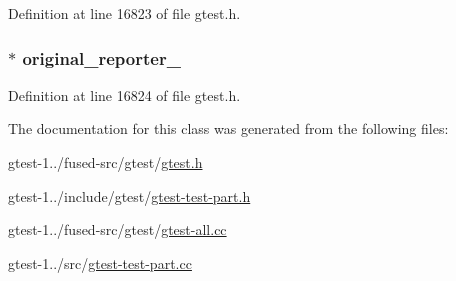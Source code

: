 \-Definition at line 16823 of file gtest.\-h.

\hypertarget{classtesting_1_1internal_1_1HasNewFatalFailureHelper_ab0d32f3081f7eed6e6d666da323ab32a}{
\subsubsection[{original\-\_\-reporter\-\_\-}]{ $\ast$ {\bf original\-\_\-reporter\-\_\-}}}\label{da/dba/classtesting_1_1internal_1_1HasNewFatalFailureHelper_ab0d32f3081f7eed6e6d666da323ab32a}


\-Definition at line 16824 of file gtest.\-h.



\-The documentation for this class was generated from the following files\-:\begin{DoxyCompactItemize}
\item 
gtest-\/1../fused-\/src/gtest/\hyperlink{fused-src_2gtest_2gtest_8h}{gtest.\-h}\item 
gtest-\/1../include/gtest/\hyperlink{gtest-test-part_8h}{gtest-\/test-\/part.\-h}\item 
gtest-\/1../fused-\/src/gtest/\hyperlink{fused-src_2gtest_2gtest-all_8cc}{gtest-\/all.\-cc}\item 
gtest-\/1../src/\hyperlink{gtest-test-part_8cc}{gtest-\/test-\/part.\-cc}\end{DoxyCompactItemize}
